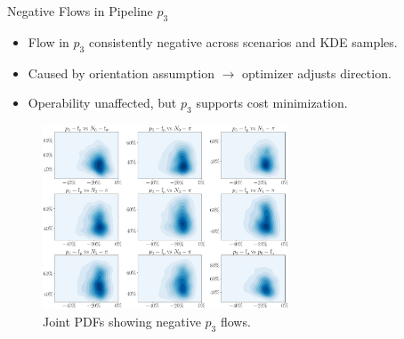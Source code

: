 \documentclass[hyperref={colorlinks,citecolor=blue,linkcolor=blue,urlcolor=blue}]{beamer}
\begin{document}

\begin{frame}{Negative Flows in Pipeline $p_3$}
\scriptsize
    \begin{itemize}
        \item Flow in $p_3$ consistently negative across scenarios and KDE samples.
        \item Caused by orientation assumption $\rightarrow$ optimizer adjusts direction.
        \item Operability unaffected, but $p_3$ supports cost minimization.
    \end{itemize}
    \begin{figure}
        \includegraphics[width=0.65\textwidth]{figures/outputs_outputs_2_cut.png}
        \caption{\scriptsize Joint PDFs showing negative $p_3$ flows.}
    \end{figure}
\end{frame}
\end{document}
